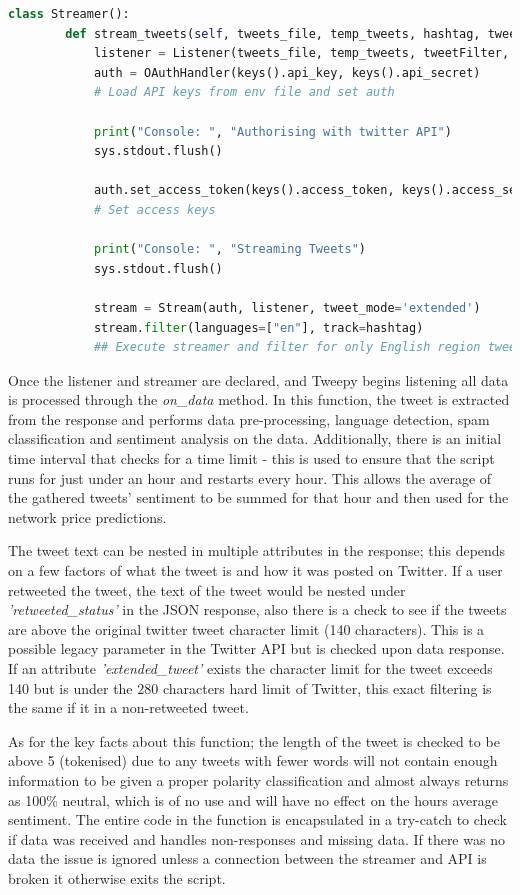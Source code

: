 \documentclass[oneside, 12pt]{article}
\begin{document}
			
			\begin{lstlisting}[language=python, caption=Tweepy Streamer setup]
	class Streamer():				
		def stream_tweets(self, tweets_file, temp_tweets, hashtag, tweetFilter, analyser):
			listener = Listener(tweets_file, temp_tweets, tweetFilter, analyser)
			auth = OAuthHandler(keys().api_key, keys().api_secret)
			# Load API keys from env file and set auth
				
			print("Console: ", "Authorising with twitter API")
			sys.stdout.flush()
				
			auth.set_access_token(keys().access_token, keys().access_secret)
			# Set access keys
						
			print("Console: ", "Streaming Tweets")
			sys.stdout.flush()
				
			stream = Stream(auth, listener, tweet_mode='extended')
			stream.filter(languages=["en"], track=hashtag)
			## Execute streamer and filter for only English region tweets and by specified hashtag ('Bitcoin')
			\end{lstlisting}
			
			Once the listener and streamer are declared, and Tweepy begins listening all data is processed through the \textit{on\_data} method. In this function, the tweet is extracted from the response and performs data pre-processing, language detection, spam classification and sentiment analysis on the data. Additionally, there is an initial time interval that checks for a time limit - this is used to ensure that the script runs for just under an hour and restarts every hour. This allows the average of the gathered tweets' sentiment to be summed for that hour and then used for the network price predictions. 
			
			The tweet text can be nested in multiple attributes in the response; this depends on a few factors of what the tweet is and how it was posted on Twitter. If a user retweeted the tweet, the text of the tweet would be nested under \textit{'retweeted\_status'} in the JSON response, also there is a check to see if the tweets are above the original twitter tweet character limit (140 characters). This is a possible legacy parameter in the Twitter API but is checked upon data response. If an attribute \textit{'extended\_tweet'} exists the character limit for the tweet exceeds 140 but is under the 280 characters hard limit of Twitter, this exact filtering is the same if it in a non-retweeted tweet.
			
			As for the key facts about this function; the length of the tweet is checked to be above 5 (tokenised) due to any tweets with fewer words will not contain enough information to be given a proper polarity classification and almost always returns as 100\% neutral, which is of no use and will have no effect on the hours average sentiment. The entire code in the function is encapsulated in a try-catch to check if data was received and handles non-responses and missing data. If there was no data the issue is ignored unless a connection between the streamer and API is broken it otherwise exits the script.	
			
\end{document}
